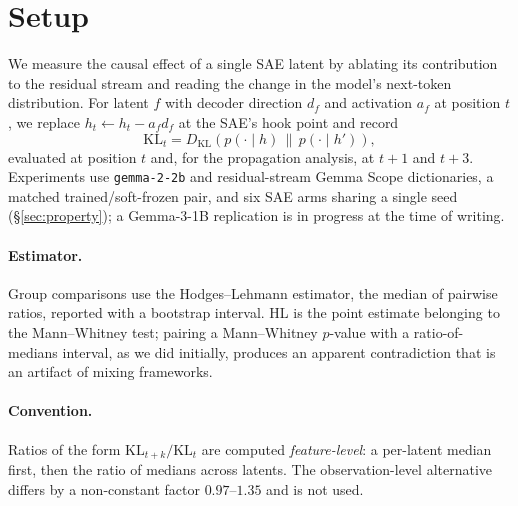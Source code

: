 \documentclass[11pt]{article}
\begin{document}
\section{Setup}
\label{sec:setup}
We measure the causal effect of a single SAE latent by ablating its contribution
to the residual stream and reading the change in the model's next-token
distribution. For latent $f$ with decoder direction $d_f$ and activation $a_f$ at
position $t$, we replace $h_t \leftarrow h_t - a_f d_f$ at the SAE's hook point
and record
\begin{equation}
\mathrm{KL}_t = D_{\mathrm{KL}}\!\left(p(\cdot \mid h) \,\|\, p(\cdot \mid h')\right),
\label{eq:kl}
\end{equation}
evaluated at position $t$ and, for the propagation analysis, at $t{+}1$ and
$t{+}3$. Experiments use \texttt{gemma-2-2b} and residual-stream Gemma Scope
dictionaries, a matched trained/soft-frozen pair, and six SAE arms sharing a
single seed (\S\ref{sec:property}); a Gemma-3-1B replication is in progress at
the time of writing.

\paragraph{Estimator.}
Group comparisons use the Hodges--Lehmann estimator, the median of pairwise
ratios, reported with a bootstrap interval. HL is the point estimate belonging to
the Mann--Whitney test; pairing a Mann--Whitney $p$-value with a
ratio-of-medians interval, as we did initially, produces an apparent
contradiction that is an artifact of mixing frameworks.

\paragraph{Convention.}
Ratios of the form $\mathrm{KL}_{t+k}/\mathrm{KL}_t$ are computed
\emph{feature-level}: a per-latent median first, then the ratio of medians across
latents. The observation-level alternative differs by a non-constant factor
$0.97$--$1.35$ and is not used.
\end{document}
